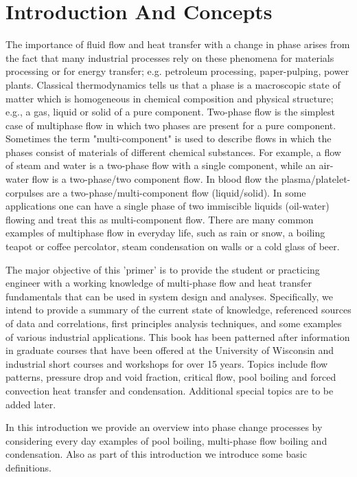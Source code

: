\chapter{Introduction And Concepts}

The importance of fluid flow and heat transfer with a change in phase arises from the fact that many industrial processes rely on these phenomena for materials processing or for energy transfer; e.g. petroleum processing, paper-pulping, power plants.
Classical thermodynamics tells us that a phase is a macroscopic state of matter which is homogeneous in chemical composition and physical structure; e.g., a gas, liquid or solid of a pure component.
Two-phase flow is the simplest case of multiphase flow in which two phases are present for a pure component.
Sometimes the term "multi-component" is used to describe flows in which the phases consist of materials of different chemical substances.
For example, a flow of steam and water is a two-phase flow with a single component, while an air-water flow is a two-phase/two component flow.
In blood flow the plasma/platelet-corpulses are a two-phase/multi-component flow (liquid/solid).
In some applications one can have a single phase of two immiscible liquids (oil-water) flowing and treat this as multi-component flow.
There are many common examples of multiphase flow in everyday life, such as rain or snow, a boiling teapot or coffee percolator, steam condensation on walls or a cold glass of beer.

The major objective of this 'primer' is to provide the student or practicing engineer with a working knowledge of multi-phase flow and heat transfer fundamentals that can be used in system design and analyses.
Specifically, we intend to provide a summary of the current state of knowledge, referenced sources of data and correlations, first principles analysis techniques, and some examples of various industrial applications.
This book has been patterned after information in graduate courses that have been offered at the University of Wisconsin and industrial short courses and workshops for over 15 years.
Topics include flow patterns, pressure drop and void fraction, critical flow, pool boiling and forced convection heat transfer and condensation.
Additional special topics are to be added later.

In this introduction we provide an overview into phase change processes by considering every day examples of pool boiling, multi-phase flow boiling and condensation.
Also as part of this introduction we introduce some basic definitions.

